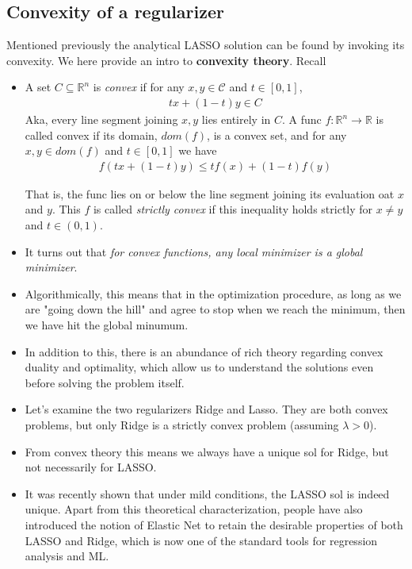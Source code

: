 \documentclass[norsk,a4paper,11pt]{article}
\begin{document}
\subsection{Convexity of a regularizer}
Mentioned previously the analytical LASSO solution can be found by invoking its convexity. We here provide an intro to \textbf{convexity theory}.
Recall
\begin{itemize}
	\item A set $C \subseteq \mathbb{R}^n$ is \textit{convex} if for any $x,y \in \mathcal{C}$ and $t \in [0,1]$,
	\begin{align}
		tx + (1-t)y \in C
	\end{align}
	Aka, every line segment joining $x, y$ lies entirely in $C$. A func $f : \mathbb{R}^n \rightarrow \mathbb{R}$ is called convex if its domain, $dom(f)$, is a convex set, and for any $x,y \in dom(f)$ and $t\in[0,1]$ we have
	\begin{align}
		f(tx + (1-t)y) \leq tf(x) + (1-t)f(y)
	\end{align}

	That is, the func lies on or below the line segment joining its evaluation oat $x$ and $y$. This $f$ is called \textit{strictly convex} if this inequality holds strictly for $x \neq y$ and $t\in (0, 1)$.

	\item It turns out that \textit{for convex functions, any local minimizer is a global minimizer}.
	\item Algorithmically, this means that in the optimization procedure, as long as we are "going down the hill" and agree to stop when we reach the minimum, then we have hit the global minumum.
	\item In addition to this, there is an abundance of rich theory regarding convex duality and optimality, which allow us to understand the solutions even before solving the problem itself.
	\item Let's examine the two regularizers Ridge and Lasso. They are both convex problems, but only Ridge is a strictly convex problem (assuming $\lambda > 0$). 
	\item From convex theory this means we always have a unique sol for Ridge, but not necessarily for LASSO.
	\item It was recently shown that under mild conditions, the LASSO sol is indeed unique. Apart from this theoretical characterization, people have also introduced the notion of Elastic Net to retain the desirable properties of both LASSO and Ridge, which is now one of the standard tools for regression analysis and ML.
\end{itemize}
\end{document}
